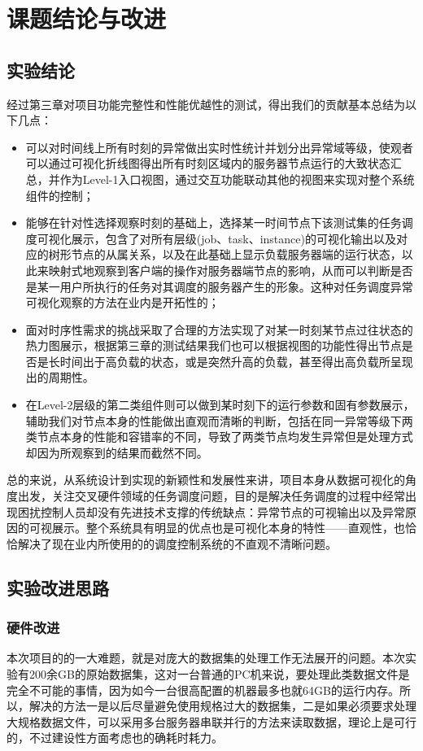 \chapter{课题结论与改进}
\section{实验结论}

经过第三章对项目功能完整性和性能优越性的测试，得出我们的贡献基本总结为以下几点：

\begin{itemize}
	\item 可以对时间线上所有时刻的异常做出实时性统计并划分出异常域等级，使观者可以通过可视化折线图得出所有时刻区域内的服务器节点运行的大致状态汇总，并作为Level-1入口视图，通过交互功能联动其他的视图来实现对整个系统组件的控制；
	\item 能够在针对性选择观察时刻的基础上，选择某一时间节点下该测试集的任务调度可视化展示，包含了对所有层级(job、task、instance)的可视化输出以及对应的树形节点的从属关系，以及在此基础上显示负载服务器端的运行状态，以此来映射式地观察到客户端的操作对服务器端节点的影响，从而可以判断是否是某一用户所执行的任务对其调度的服务器产生的形象。这种对任务调度异常可视化观察的方法在业内是开拓性的；
	\item 面对时序性需求的挑战采取了合理的方法实现了对某一时刻某节点过往状态的热力图展示，根据第三章的测试结果我们也可以根据视图的功能性得出节点是否是长时间出于高负载的状态，或是突然升高的负载，甚至得出高负载所呈现出的周期性。
	\item 在Level-2层级的第二类组件则可以做到某时刻下的运行参数和固有参数展示，辅助我们对节点本身的性能做出直观而清晰的判断，包括在同一异常等级下两类节点本身的性能和容错率的不同，导致了两类节点均发生异常但是处理方式却因为所观察到的结果而截然不同。
\end{itemize}

总的来说，从系统设计到实现的新颖性和发展性来讲，项目本身从数据可视化的角度出发，关注交叉硬件领域的任务调度问题，目的是解决任务调度的过程中经常出现困扰控制人员却没有先进技术支撑的传统缺点：异常节点的可视输出以及异常原因的可视展示。整个系统具有明显的优点也是可视化本身的特性——直观性，也恰恰解决了现在业内所使用的的调度控制系统的不直观不清晰问题。

\section{实验改进思路}
\subsection{硬件改进}
本次项目的的一大难题，就是对庞大的数据集的处理工作无法展开的问题。本次实验有200余GB的原始数据集，这对一台普通的PC机来说，要处理此类数据文件是完全不可能的事情，因为如今一台很高配置的机器最多也就64GB的运行内存。所以，解决的方法一是以后尽量避免使用规格过大的数据集，二是如果必须要求处理大规格数据文件，可以采用多台服务器串联并行的方法来读取数据，理论上是可行的，不过建设性方面考虑也的确耗时耗力。

